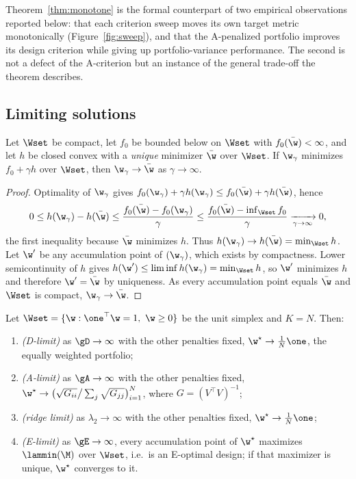 \begin{remark}
Theorem~\ref{thm:monotone} is the formal counterpart of two empirical
observations reported below: that each criterion sweep moves its own target
metric monotonically (Figure~\ref{fig:sweep}), and that the A-penalized portfolio
improves its design criterion while giving up portfolio-variance performance. The
second is not a defect of the A-criterion but an instance of the general
trade-off the theorem describes.
\end{remark}

\subsection{Limiting solutions}

\begin{lemma}
\label{lem:penaltylimit}
Let $\Wset$ be compact, let $f_0$ be bounded below on $\Wset$ with
$f_0(\bar\w)<\infty$, and let $h$ be closed convex with a \emph{unique} minimizer
$\bar\w$ over $\Wset$. If $\w_\gamma$ minimizes $f_0+\gamma h$ over $\Wset$, then
$\w_\gamma\to\bar\w$ as $\gamma\to\infty$.
\end{lemma}

\begin{proof}
Optimality of $\w_\gamma$ gives
$f_0(\w_\gamma)+\gamma h(\w_\gamma)\le f_0(\bar\w)+\gamma h(\bar\w)$, hence
\[
  0\le h(\w_\gamma)-h(\bar\w)\le\frac{f_0(\bar\w)-f_0(\w_\gamma)}{\gamma}
  \le\frac{f_0(\bar\w)-\inf_{\Wset}f_0}{\gamma}\xrightarrow[\gamma\to\infty]{}0 ,
\]
the first inequality because $\bar\w$ minimizes $h$. Thus
$h(\w_\gamma)\to h(\bar\w)=\min_{\Wset}h$. Let $\w'$ be any accumulation point of
$(\w_\gamma)$, which exists by compactness. Lower semicontinuity of $h$ gives
$h(\w')\le\liminf h(\w_\gamma)=\min_{\Wset}h$, so $\w'$ minimizes $h$ and
therefore $\w'=\bar\w$ by uniqueness. As every accumulation point equals
$\bar\w$ and $\Wset$ is compact, $\w_\gamma\to\bar\w$.
\end{proof}

\begin{theorem}
\label{thm:limits}
Let $\Wset=\{\w:\one^\top\w=1,\ \w\ge0\}$ be the unit simplex and $K=N$. Then:
\begin{enumerate}[label=(\roman*),leftmargin=2.0em,itemsep=0.2em]
  \item \emph{(D-limit)} as $\gD\to\infty$ with the other penalties fixed,
    $\w^\star\to\tfrac1N\one$, the equally weighted portfolio;
  \item \emph{(A-limit)} as $\gA\to\infty$ with the other penalties fixed,
    $\w^\star\to\big(\sqrt{G_{ii}}\big/\sum_{j}\sqrt{G_{jj}}\big)_{i=1}^{N}$,
    where $G=(V^\top V)^{-1}$;
  \item \emph{(ridge limit)} as $\lambda_2\to\infty$ with the other penalties
    fixed, $\w^\star\to\tfrac1N\one$;
  \item \emph{(E-limit)} as $\gE\to\infty$, every accumulation point of
    $\w^\star$ maximizes $\lammin(\M)$ over $\Wset$, i.e.\ is an E-optimal
    design; if that maximizer is unique, $\w^\star$ converges to it.
\end{enumerate}
\end{theorem}

